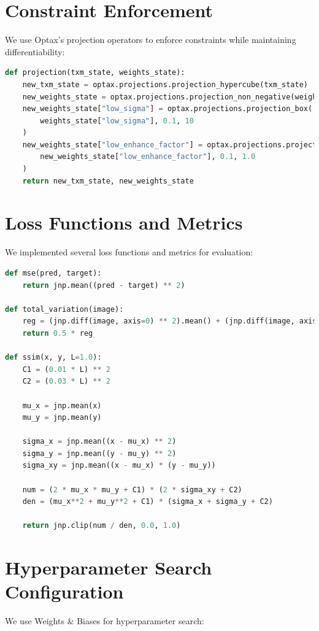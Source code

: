 \documentclass[nomenclature, english, bibtex]{kththesis}
\numberwithin{listing}{chapter}
\begin{document}
\section{Constraint Enforcement}
We use Optax's projection operators to enforce constraints while maintaining differentiability:

\begin{lstlisting}[language=Python, caption=Projection function for constraint enforcement]
def projection(txm_state, weights_state):
    new_txm_state = optax.projections.projection_hypercube(txm_state)
    new_weights_state = optax.projections.projection_non_negative(weights_state)
    new_weights_state["low_sigma"] = optax.projections.projection_box(
        weights_state["low_sigma"], 0.1, 10
    )
    new_weights_state["low_enhance_factor"] = optax.projections.projection_box(
        new_weights_state["low_enhance_factor"], 0.1, 1.0
    )
    return new_txm_state, new_weights_state
\end{lstlisting}

\section{Loss Functions and Metrics}
We implemented several loss functions and metrics for evaluation:

\begin{lstlisting}[language=Python, caption=Loss functions and metrics]
def mse(pred, target):
    return jnp.mean((pred - target) ** 2)

def total_variation(image):
    reg = (jnp.diff(image, axis=0) ** 2).mean() + (jnp.diff(image, axis=1) ** 2).mean()
    return 0.5 * reg

def ssim(x, y, L=1.0):
    C1 = (0.01 * L) ** 2
    C2 = (0.03 * L) ** 2

    mu_x = jnp.mean(x)
    mu_y = jnp.mean(y)

    sigma_x = jnp.mean((x - mu_x) ** 2)
    sigma_y = jnp.mean((y - mu_y) ** 2)
    sigma_xy = jnp.mean((x - mu_x) * (y - mu_y))

    num = (2 * mu_x * mu_y + C1) * (2 * sigma_xy + C2)
    den = (mu_x**2 + mu_y**2 + C1) * (sigma_x + sigma_y + C2)

    return jnp.clip(num / den, 0.0, 1.0)
\end{lstlisting}

\section{Hyperparameter Search Configuration}
We use Weights \& Biases for hyperparameter search:
\end{document}
